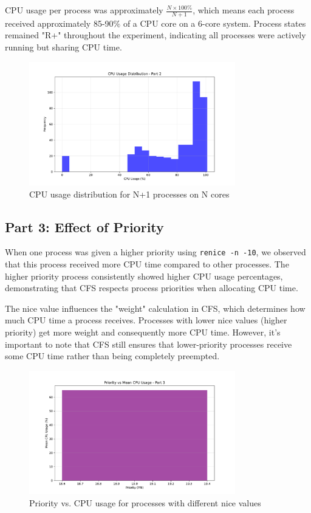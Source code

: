 \documentclass[12pt,a4paper]{article}
\begin{document}
CPU usage per process was approximately $\frac{N \times 100\%}{N+1}$, which means each process received approximately 85-90\% of a CPU core on a 6-core system. Process states remained "R+" throughout the experiment, indicating all processes were actively running but sharing CPU time.

\begin{figure}[H]
    \centering
    \includegraphics[width=0.8\textwidth]{figures/cpu_dist_part2.pdf}
    \caption{CPU usage distribution for N+1 processes on N cores}
    \label{fig:part2_cpu}
\end{figure}

\subsection{Part 3: Effect of Priority}

When one process was given a higher priority using \texttt{renice -n -10}, we observed that this process received more CPU time compared to other processes. The higher priority process consistently showed higher CPU usage percentages, demonstrating that CFS respects process priorities when allocating CPU time.

The nice value influences the "weight" calculation in CFS, which determines how much CPU time a process receives. Processes with lower nice values (higher priority) get more weight and consequently more CPU time. However, it's important to note that CFS still ensures that lower-priority processes receive some CPU time rather than being completely preempted.

\begin{figure}[H]
    \centering
    \includegraphics[width=0.8\textwidth]{figures/priority_cpu_part3.pdf}
    \caption{Priority vs. CPU usage for processes with different nice values}
    \label{fig:part3_priority}
\end{figure}
\end{document}
